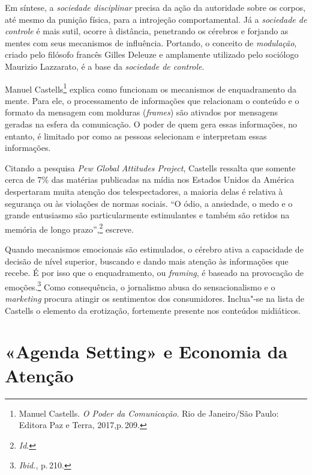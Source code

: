 Em síntese, a \textit{sociedade disciplinar} precisa da ação da autoridade
sobre os corpos, até mesmo da punição física, para a introjeção
comportamental. Já a \textit{sociedade de controle} é mais sutil, ocorre à
distância, penetrando os cérebros e forjando as mentes com seus
mecanismos de influência. Portando, o conceito de \textit{modulação},
criado pelo filósofo francês Gilles Deleuze e amplamente utilizado pelo
sociólogo Maurizio Lazzarato, é a base da \textit{sociedade de controle}.

Manuel Castells\footnote{Manuel Castells. \textit{O Poder da Comunicação}.
Rio de Janeiro/São Paulo: Editora Paz e Terra, 2017,p.\,209.} explica como funcionam os mecanismos de
enquadramento da mente. Para ele, o processamento de informações que
relacionam o conteúdo e o formato da mensagem com molduras
(\textit{frames}) são ativados por mensagens geradas na esfera da
comunicação. O poder de quem gera essas informações, no entanto, é
limitado por como as pessoas selecionam e interpretam essas informações.

Citando a pesquisa \textit{Pew Global Attitudes Project}, Castells
ressalta que somente cerca de 7\% das matérias publicadas na mídia nos
Estados Unidos da América despertaram muita atenção dos telespectadores,
a maioria delas é relativa à segurança ou às violações de normas
sociais. ``O ódio, a ansiedade, o medo e o grande entusiasmo são
particularmente estimulantes e também são retidos na memória de longo
prazo'',\footnote{\textit{Id}.} escreve. 

Quando mecanismos emocionais
são estimulados, o cérebro ativa a capacidade de decisão de nível
superior, buscando e dando mais atenção às informações que recebe. É por
isso que o enquadramento, ou \textit{framing}, é baseado na provocação de
emoções.\footnote{\textit{Ibid.}, p.\,210.} Como consequência, o jornalismo abusa do
sensacionalismo e o \textit{marketing} procura atingir os sentimentos dos
consumidores. Inclua"-se na lista de Castells o elemento da erotização,
fortemente presente nos conteúdos midiáticos.

\section{«Agenda Setting» e Economia da Atenção}

